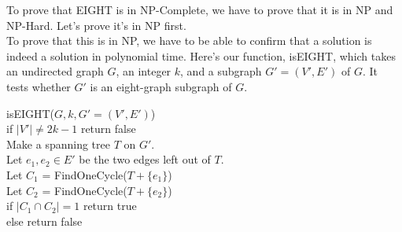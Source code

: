 \documentclass[11pt]{article}
\begin{document}
\begin{solution}
    To prove that EIGHT is in NP-Complete, we have to prove that it is in NP and NP-Hard. Let's prove it's in NP first. 
    \\ To prove that this is in NP, we have to be able to confirm that a solution is indeed a solution in polynomial time. Here's our function, isEIGHT, which takes an undirected graph $G$, an integer $k$, and a subgraph $G' = (V', E')$ of $G$. 
    It tests whether $G'$ is an eight-graph subgraph of $G$.
    \begin{algo}
        isEIGHT($G, k, G' = (V', E')$) \+
        \\ if $|V'| \not = 2k - 1$ return false
        \\ Make a spanning tree $T$ on $G'$. 
        \\ Let $e_1, e_2 \in E'$ be the two edges left out of $T$.
        \\ Let $C_1$ = FindOneCycle($T + \{e_1\}$)
        \\ Let $C_2$ = FindOneCycle($T + \{e_2\}$)
        \\ if $|C_1 \cap C_2| = 1$ return true
        \\ else return false \-


\end{algo}
\end{solution}
\end{document}
